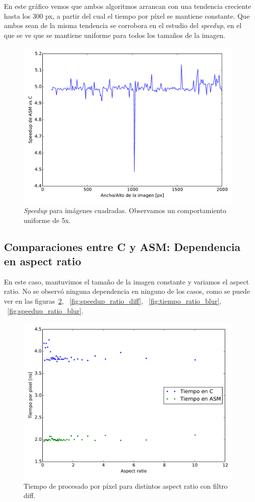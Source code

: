 En este gráfico vemos que ambos algoritmos arrancan con una tendencia
creciente hasta los 300 px, a partir del cual el tiempo por píxel se
mantiene constante. Que ambos sean de la misma tendencia se corrobora
en el estudio del \emph{speedup}, en el que se ve que se mantiene
uniforme para todos los tamaños de la imagen.

\begin{figure}
  \centering
  \includegraphics[width=0.7\columnwidth]{speedup_blur.pdf}
  \caption{\emph{Speedup} para imágenes cuadradas. Observamos un
    comportamiento uniforme de 5x.}
  \label{fig:speedup_blur}
\end{figure}


\subsection{Comparaciones entre C y ASM: Dependencia en aspect ratio}

En este caso, mantuvimos el tamaño de la imagen constante y variamos
el aspect ratio. No se observó ninguna dependencia en ninguno de los
casos, como se puede ver en las figuras~\ref{fig:tiempo_ratio_diff},
~\ref{fig:speedup_ratio_diff}, ~\ref{fig:tiempo_ratio_blur},
~\ref{fig:speedup_ratio_blur}.

\begin{figure}
  \centering
  \includegraphics[width=0.7\columnwidth]{tiempo_ratio_diff.pdf}
  \caption{Tiempo de procesado por píxel para distintos aspect ratio
    con filtro diff.}
  \label{fig:tiempo_ratio_diff}
\end{figure}

